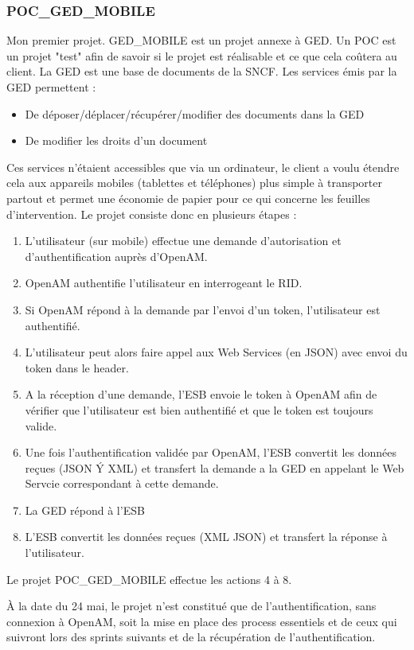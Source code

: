 \subsubsection{POC\_GED\_MOBILE}
Mon premier projet. GED\_MOBILE est un projet annexe à GED. Un POC est un projet "test" afin de savoir si le projet est réalisable et ce que cela coûtera au client. La GED est une base de documents de la SNCF. Les services émis par la GED permettent :
\begin{itemize}
	\item De déposer/déplacer/récupérer/modifier des documents dans la GED\item De modifier les droits d'un document
\end{itemize}
Ces services n'étaient accessibles que via un ordinateur, le client a voulu étendre cela aux appareils mobiles (tablettes et téléphones) plus simple à transporter partout et permet une économie de papier pour ce qui concerne les feuilles d'intervention. Le projet consiste donc en plusieurs étapes :
\begin{enumerate}
	 \item L'utilisateur (sur mobile) effectue une demande d'autorisation et d'authentification auprès d'OpenAM. 
	 \item OpenAM authentifie l'utilisateur en interrogeant le RID. 
	 \item Si OpenAM répond à la demande par l'envoi d'un token, l'utilisateur est authentifié. 
	 \item L'utilisateur peut alors faire appel aux Web Services (en JSON) avec envoi du token dans le header. 
	 \item A la réception d'une demande, l'ESB envoie le token à OpenAM afin de vérifier que l'utilisateur est bien authentifié et que le token est toujours valide. 
	 \item Une fois l'authentification validée par OpenAM, l'ESB convertit les données reçues (JSON Ý XML) et transfert la demande a la GED en appelant le Web Servcie correspondant à cette demande. 
	 \item La GED répond à l'ESB 
	 \item L'ESB convertit les données reçues (XML  JSON) et transfert la réponse à l'utilisateur.  
\end{enumerate}
Le projet POC\_GED\_MOBILE effectue les actions 4 à 8.

À la date du 24 mai, le projet n'est constitué que de l'authentification, sans connexion à OpenAM, soit la mise en place des process essentiels et de ceux qui suivront lors des sprints suivants et de la récupération de l'authentification.

